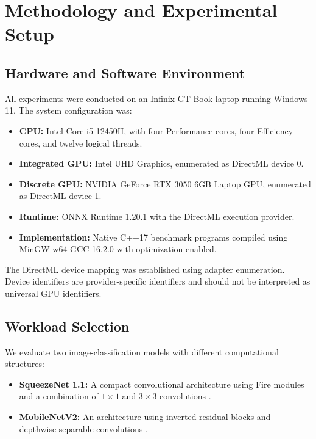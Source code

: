 \documentclass[pdflatex,sn-mathphys-num]{sn-jnl}
\begin{document}
\section{Methodology and Experimental Setup}

\subsection{Hardware and Software Environment}

All experiments were conducted on an Infinix GT Book laptop running Windows 11. The system configuration was:

\begin{itemize}
    \item \textbf{CPU:} Intel Core i5-12450H, with four Performance-cores, four Efficiency-cores, and twelve logical threads.
    \item \textbf{Integrated GPU:} Intel UHD Graphics, enumerated as DirectML device 0.
    \item \textbf{Discrete GPU:} NVIDIA GeForce RTX 3050 6GB Laptop GPU, enumerated as DirectML device 1.
    \item \textbf{Runtime:} ONNX Runtime 1.20.1 with the DirectML execution provider.
    \item \textbf{Implementation:} Native C++17 benchmark programs compiled using MinGW-w64 GCC 16.2.0 with optimization enabled.
\end{itemize}

The DirectML device mapping was established using adapter enumeration. Device identifiers are provider-specific identifiers and should not be interpreted as universal GPU identifiers.

\subsection{Workload Selection}

We evaluate two image-classification models with different computational structures:

\begin{itemize}
    \item \textbf{SqueezeNet 1.1:} A compact convolutional architecture using Fire modules and a combination of $1 \times 1$ and $3 \times 3$ convolutions \cite{iandola2016squeezenet}.
    \item \textbf{MobileNetV2:} An architecture using inverted residual blocks and depthwise-separable convolutions \cite{sandler2018mobilenetv2}.
\end{itemize}
\end{document}
